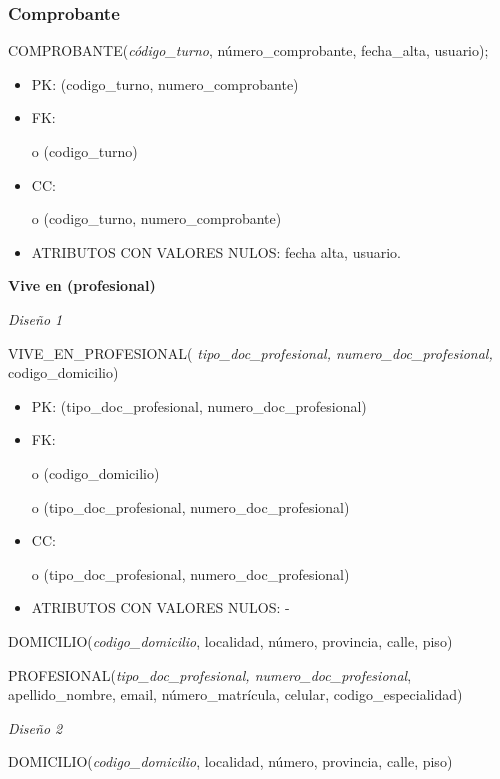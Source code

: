 \documentclass[a4paper,11pt]{article}
\begin{document}
\subsubsection{\textbf{Comprobante}}

COMPROBANTE(\emph{código\_turno}, número\_comprobante, fecha\_alta, usuario);

\begin{itemize}
\item PK: (codigo\_turno, numero\_comprobante)

\item FK: 

o (codigo\_turno)

\item CC:

o (codigo\_turno, numero\_comprobante)

\item ATRIBUTOS CON VALORES NULOS:  fecha alta, usuario.
\end{itemize}

\textbf{Vive en (profesional)}

\textit{Diseño 1}

VIVE\_EN\_PROFESIONAL(\emph{ tipo\_doc\_profesional, numero\_doc\_profesional, 
}codigo\_domicilio)

\begin{itemize}
\item PK: (tipo\_doc\_profesional, numero\_doc\_profesional)

\item FK: 

o (codigo\_domicilio)

o (tipo\_doc\_profesional, numero\_doc\_profesional)

\item CC:

o (tipo\_doc\_profesional, numero\_doc\_profesional)

\item ATRIBUTOS CON VALORES NULOS: -
\end{itemize}

DOMICILIO(\emph{codigo\_domicilio}, localidad, número, provincia, calle, piso)

PROFESIONAL(\emph{tipo\_doc\_profesional, numero\_doc\_profesional}, apellido\_nombre, 
email, número\_matrícula, celular, codigo\_especialidad)

\textit{Diseño 2}

DOMICILIO(\emph{codigo\_domicilio}, localidad, número, provincia, calle, piso)
\end{document}
